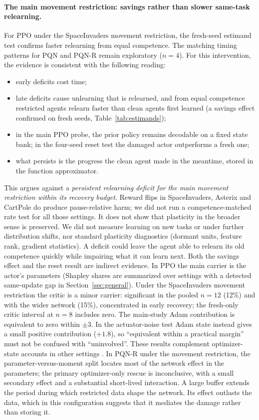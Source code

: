 \documentclass[10pt]{article} %
\begin{document}
\paragraph{The main movement restriction: savings rather than slower same-task relearning.}
For PPO under the SpaceInvaders movement restriction, the fresh-seed estimand test confirms faster relearning from equal competence. The matching timing patterns for PQN and PQN-R remain exploratory ($n=4$). For this intervention, the evidence is consistent with the following reading:
\begin{itemize}
\item early deficits cost time;
\item late deficits cause unlearning that is relearned, and from equal competence restricted agents relearn faster than clean agents first learned (a savings effect confirmed on fresh seeds, Table~\ref{tab:estimands});
\item in the main PPO probe, the prior policy remains decodable on a fixed state bank; in the four-seed reset test the damaged actor outperforms a fresh one;
\item what persists is the progress the clean agent made in the meantime, stored in the function approximator.
\end{itemize}
This argues against a \emph{persistent relearning deficit for the main movement restriction within its recovery budget}. Reward flips in SpaceInvaders, Asterix and CartPole do produce pause-relative harm; we did not run a competence-matched rate test for all those settings. It does not show that plasticity in the broader sense is preserved. We did not measure learning on new tasks or under further distribution shifts, nor standard plasticity diagnostics (dormant units, feature rank, gradient statistics). A deficit could leave the agent able to relearn its old competence quickly while impairing what it can learn next. Both the savings effect and the reset result are indirect evidence.
In PPO the main carrier is the actor's parameters (Shapley shares are summarized over settings with a detected same-update gap in Section~\ref{sec:general}). Under the SpaceInvaders movement restriction the critic is a minor carrier: significant in the pooled $n=12$ (12\%) and with the wider network (15\%), concentrated in early recovery; the fresh-only critic interval at $n=8$ includes zero. The main-study Adam contribution is equivalent to zero within $\pm3$. In the actuator-noise test Adam state instead gives a small positive contribution ($+1.8$), so ``equivalent within a practical margin'' must not be confused with ``uninvolved''. These results complement optimizer-state accounts in other settings \citep{dohare2023collapse,xu2026optimizer}. In PQN-R under the movement restriction, the parameter-versus-moment split locates most of the network effect in the parameters; the primary optimizer-only rescue is inconclusive, with a small secondary effect and a substantial short-lived interaction. A large buffer extends the period during which restricted data shape the network. Its effect outlasts the data, which in this configuration suggests that it mediates the damage rather than storing it.
\end{document}
